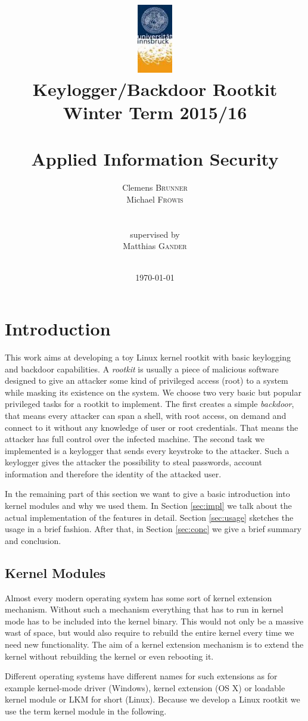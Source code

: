 \documentclass[12pt]{article}
\title{\includegraphics[height=3cm]{logo} \\
\huge{Keylogger/Backdoor Rootkit} \\\large{Winter Term 2015/16} \\\quad \\\huge{Applied Information Security}}
\author{Clemens \textsc{Brunner}\\
        Michael \textsc{Fröwis} \\
        \\
        \\
	supervised by \\
	Matthias \textsc{Gander} \\ \\} %
\date{\today} %
\begin{document}
\maketitle %
\thispagestyle{empty}
\newpage
\tableofcontents
\thispagestyle{empty}

\newpage

\section{Introduction}

This work aims at developing a toy Linux kernel rootkit with basic keylogging and backdoor capabilities. A \emph{rootkit} is usually a piece of malicious software designed to give an attacker some kind of privileged access (root) to a system while masking its existence on the system. We choose two very basic but popular privileged tasks for a rootkit to implement. The first creates a simple \emph{backdoor}, that means every attacker can span a shell, with root access, on demand and connect to it without any knowledge of user or root credentials. That means the attacker has full control over the infected machine. The second task we implemented is a keylogger that sends every keystroke to the attacker. Such a keylogger gives the attacker the possibility to steal passwords, account information and therefore the identity of the attacked user.  

In the remaining part of this section we want to give a basic introduction into kernel modules and why we used them. In Section \ref{sec:impl} we talk about the actual implementation of the features in detail. Section \ref{sec:usage} sketches the usage in a brief fashion. After that, in Section \ref{sec:conc} we give a brief summary and conclusion. 


\subsection{Kernel Modules}

Almost every modern operating system has some sort of kernel extension mechanism. Without such a mechanism everything that has to run in kernel mode has to be included into the kernel binary. This would not only be a massive wast of space, but would also require to rebuild the entire kernel every time we need new functionality. The aim of a kernel extension mechanism is to extend the kernel without rebuilding the kernel or even rebooting it. 

Different operating systems have different names for such extensions as for example kernel-mode driver (Windows), kernel extension (OS X) or loadable kernel module or LKM for short (Linux). Because we develop a Linux rootkit we use the term kernel module in the following. 
\end{document}
